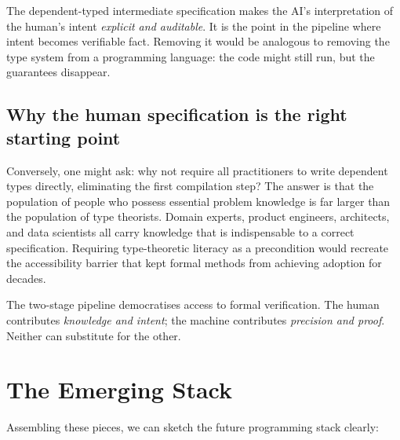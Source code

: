 \documentclass[12pt]{article}
\begin{document}
The dependent-typed intermediate specification makes the AI's interpretation
of the human's intent \emph{explicit and auditable}. It is the point in the
pipeline where intent becomes verifiable fact. Removing it would be analogous
to removing the type system from a programming language: the code might still
run, but the guarantees disappear.

\subsection{Why the human specification is the right starting point}

Conversely, one might ask: why not require all practitioners to write
dependent types directly, eliminating the first compilation step? The answer
is that the population of people who possess essential problem knowledge is
far larger than the population of type theorists. Domain experts, product
engineers, architects, and data scientists all carry knowledge that is
indispensable to a correct specification. Requiring type-theoretic literacy
as a precondition would recreate the accessibility barrier that kept formal
methods from achieving adoption for decades.

The two-stage pipeline democratises access to formal verification. The human
contributes \emph{knowledge and intent}; the machine contributes
\emph{precision and proof}. Neither can substitute for the other.

\section{The Emerging Stack}

Assembling these pieces, we can sketch the future programming stack clearly:
\end{document}
